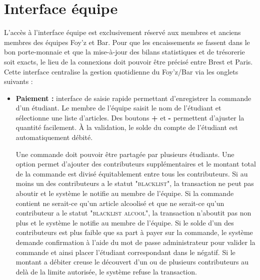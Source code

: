 \documentclass[a4paper,11pt]{article}
\begin{document}
\section{Interface équipe}
L'accès à l'interface équipe est exclusivement réservé aux membres et anciens membres des équipes Foy'z et Bar. Pour que les encaissements se fassent dans le bon porte-monnaie et que la mise-à-jour des bilans statistiques et de trésorerie soit exacts, le lieu de la connexions doit pouvoir être précisé entre Brest et Paris. Cette interface centralise la gestion quotidienne du Foy'z/Bar via les onglets suivants :

\begin{itemize}
    \item \textbf{Paiement :} interface de saisie rapide permettant d'enregistrer la commande d'un étudiant. Le membre de l'équipe saisit le nom de l'étudiant et sélectionne une liste d'articles. Des boutons \textbf{+} et \textbf{-} permettent d'ajuster la quantité facilement. À la validation, le solde du compte de l'étudiant est automatiquement débité. 
    
    Une commande doit pouvoir être partagée par plusieurs étudiants. Une option permet d'ajouter des contributeurs supplémentaires et le montant total de la commande est divisé équitablement entre tous les contributeurs. Si au moins un des contributeurs a le statut \textsc{"blacklist"}, la transaction ne peut pas aboutir et le système le notifie au membre de l'équipe. Si la commande contient ne serait-ce qu'un article alcoolisé et que ne serait-ce qu'un contributeur a le statut \textsc{"blacklist alcool"}, la transaction n'aboutit pas non plus et le système le notifie au membre de l'équipe. Si le solde d'un des contributeurs est plus faible que sa part à payer sur la commande, le système demande confirmation à l'aide du mot de passe administrateur pour valider la commande et ainsi placer l'étudiant correspondant dans le négatif. Si le montant a débiter creuse le découvert d'un ou de plusieurs contributeurs au delà de la limite autorisée, le système refuse la transaction. 
    

\end{itemize}
\end{document}
